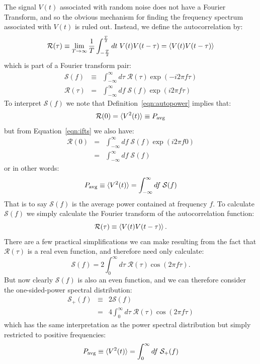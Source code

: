 \documentclass[12pt]{article}
\begin{document}
The signal $V(t)$ associated with random noise does not have a Fourier Transform, and so the obvious mechanism for finding the frequency spectrum associated with $V(t)$ is ruled out.  Instead, we define the autocorrelation by:
\begin{equation}
\mathcal{R}(\tau) \equiv \lim_{T \to \infty } \frac{1}{T} \int_{-\frac{T}{2}}^{\frac{T}{2}} dt \; V(t) V(t-\tau) = \braket{V(t) V(t-\tau)}
\label{eqn:autopower}
\end{equation}
which is part of a Fourier transform pair:
\begin{eqnarray}
\mathcal{S}(f) &\equiv& \int_{-\infty}^{\infty} d\tau \; \mathcal{R}(\tau) \exp(-i2\pi f \tau) \\ 
\mathcal{R}(\tau) &=& \int_{-\infty}^{\infty} df \; \mathcal{S}(f) \exp(i2\pi f \tau)  \label{eqn:ifts}
\end{eqnarray}
To interpret $\mathcal{S}(f)$ we note that Definition~\ref{eqn:autopower} implies that:
\begin{displaymath}
\mathcal{R}(0) = \braket{V^2(t)} \equiv P_{\rm avg}
\end{displaymath}
but from Equation~\ref{eqn:ifts} we also have:
\begin{eqnarray*}
\mathcal{R}(0) &=& \int_{-\infty}^{\infty} df \; \mathcal{S}(f) \exp(i2\pi f 0) \\
        &=& \int_{-\infty}^{\infty} df \; \mathcal{S}(f)
\end{eqnarray*}
or in other words:
\begin{displaymath}
P_{\rm avg} \equiv \braket{V^2(t)} = \int_{-\infty}^{\infty} df \; \mathcal{S}(f) 
\end{displaymath}
That is to say $\mathcal{S}(f)$ is the average power contained at frequency $f$.  To calculate $\mathcal{S}(f)$ we simply calculate the Fourier transform of the autocorrelation function:
\begin{equation}
\mathcal{R}(\tau) \equiv \braket{V(t) V(t-\tau)}.
\end{equation}
There are a few practical simplifications we can make resulting from the fact that $\mathcal{R}(\tau)$
is a real even function, and therefore need only calculate:
\begin{displaymath}
\mathcal{S}(f) =2  \int^{\infty}_{0} d\tau \; \mathcal{R}(\tau) \cos(2\pi f \tau).
\end{displaymath}
But now clearly $\mathcal{S}(f)$ is also an even function, and we can therefore consider the one-sided-power spectral distribution:
\begin{eqnarray}
\mathcal{S}_{+}(f) &\equiv& 2 \mathcal{S}(f) \\ 
&=& 4  \int^{\infty}_{0} d\tau \; \mathcal{R}(\tau) \cos(2\pi f \tau) 
\end{eqnarray}
which has the same interpretation as the power spectral distribution but simply restricted to positive frequencies:
\begin{equation}
P_{\rm avg} \equiv \braket{V^2(t)} = \int_{0}^{\infty} df \; \mathcal{S}_+(f) 
\end{equation}
\end{document}
